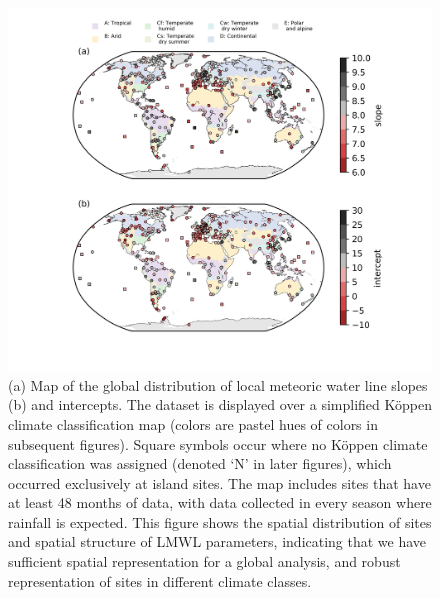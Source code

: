\documentclass[draft, linenumbers]{agujournal2018}
\begin{document}
\begin{figure}
  \includegraphics[width=7in]{Figs/Fig2.png}
  \caption{(a) Map of the global distribution of local meteoric water line slopes (b) and intercepts. The dataset is displayed over a simplified K{\"o}ppen climate classification map (colors are pastel hues of colors in subsequent figures). Square symbols occur where no K{\"o}ppen climate classification was assigned (denoted `N' in later figures), which occurred exclusively at island sites. The map includes sites that have at least 48 months of data, with data collected in every season where rainfall is expected. This figure shows the spatial distribution of sites and spatial structure of LMWL parameters, indicating that we have sufficient spatial representation for a global analysis, and robust representation of sites in different climate classes.}
  \label{fig:lmwlpoints}
\end{figure}
\end{document}
